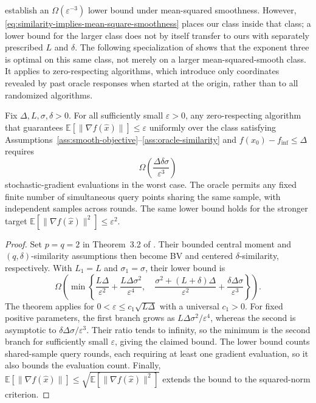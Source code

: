 \citet{arjevani2022lowerboundsnonconvexstochastic} establish an
$\Omega(\varepsilon^{-3})$ lower bound under mean-squared smoothness.
However, \eqref{eq:similarity-implies-mean-square-smoothness} places
our class inside that class; a lower bound for the larger class does
not by itself transfer to ours with separately prescribed $L$ and $\delta$.
The following specialization of \citet{pmlr-v300-fradin26a} shows
that the exponent three is optimal on this same class, not merely
on a larger mean-squared-smooth class. It applies to zero-respecting
algorithms, which introduce only coordinates revealed by past oracle
responses when started at the origin, rather than to all randomized
algorithms.

\begin{corollary}
\label{cor:common-class-lower-bound}
Fix $\Delta,L,\sigma,\delta>0$. For all sufficiently small
$\varepsilon>0$, any zero-respecting algorithm that guarantees
$\mathbb E[\|\nabla f(\widehat x)\|]\leq\varepsilon$ uniformly over
the class satisfying
Assumptions~\ref{ass:smooth-objective}--\ref{ass:oracle-similarity}
and $f(x_0)-f_{\inf}\leq\Delta$ requires
\begin{equation}
\label{eq:common-class-oracle-lower-bound}
\Omega\!\left(\frac{\Delta\delta\sigma}{\varepsilon^3}\right)
\end{equation}
stochastic-gradient evaluations in the worst case.
The oracle permits any fixed finite number of simultaneous query
points sharing the same sample, with independent samples across rounds.
The same lower bound holds for the stronger target
$\mathbb E[\|\nabla f(\widehat x)\|^2]\leq\varepsilon^2$.
\end{corollary}

\begin{proof}
Set $p=q=2$ in Theorem~3.2 of \citet{pmlr-v300-fradin26a}.
Their bounded central moment and $(q,\delta)$-similarity assumptions
then become BV and centered $\delta$-similarity, respectively.
With $L_1=L$ and $\sigma_1=\sigma$, their lower bound is
\[
\Omega\!\left(
\min\left\{
\frac{L\Delta}{\varepsilon^2}
+\frac{L\Delta\sigma^2}{\varepsilon^4},
\quad
\frac{\sigma^2+(L+\delta)\Delta}{\varepsilon^2}
+\frac{\delta\Delta\sigma}{\varepsilon^3}
\right\}
\right).
\]
The theorem applies for $0<\varepsilon\leq c_1\sqrt{L\Delta}$
with a universal $c_1>0$.
For fixed positive parameters, the first branch grows as
$L\Delta\sigma^2/\varepsilon^4$, whereas the second is asymptotic to
$\delta\Delta\sigma/\varepsilon^3$. Their ratio tends to infinity,
so the minimum is the second branch for sufficiently small
$\varepsilon$, giving the claimed bound.
The lower bound counts shared-sample query rounds, each requiring
at least one gradient evaluation, so it also bounds the evaluation
count. Finally,
$\mathbb E[\|\nabla f(\widehat x)\|]
\leq\sqrt{\mathbb E[\|\nabla f(\widehat x)\|^2]}$
extends the bound to the squared-norm criterion.
\end{proof}

